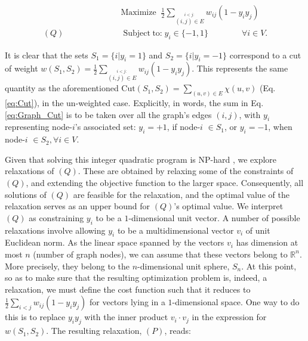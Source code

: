 \vspace{-5mm}
\begin{equation}\label{eq:Graph_Cut}
  \begin{split}
  &\mathrm{Maximize}\;\;\frac{1}{2}\sum_{\stackrel{i < j:}{(i,j)\in E}}w_{i j}(1-y_{i}y_{j}) \\
  (Q)\qquad\qquad\qquad&\operatorname{Subject\;to:}y_{i}\in\{-1,1\}\qquad\qquad\forall i\in V.
  \end{split}
\end{equation}

\sloppy
\noindent It is clear that the sets $S_1 = \{i|y_i=1\}$ and $S_2 = \{i|y_i=-1\}$ correspond to a cut of weight $w(S_1, S_2) = \frac{1}{2}\sum_{\stackrel{i < j:}{(i,j)\in E}}w_{ij}\left(1-y_{i}y_{j}\right)$. This  represents the same quantity as the aforementioned $\text{Cut}(S_1, S_2) = \sum_{(u, v) \in E} \chi(u, v)$ (Eq. \ref{eq:Cut}), in the un-weighted case. Explicitly, in words, the sum in Eq. \ref{eq:Graph_Cut} is to be taken over all the graph's edges $(i, j)$, with $y_{i}$ representing node-$i$'s associated set: $y_{i}=+1$, if node-$i$ $\in S_1$, or $y_{i}=-1$, when node-$i$ $\in S_2, \forall i \in V$.

Given that solving this integer quadratic program is NP-hard \cite{GW-Algorithm}, we explore relaxations of $(Q)$. These are obtained by relaxing some of the constraints of $(Q)$, and extending the objective function to the larger space. Consequently, all solutions of $(Q)$ are feasible for the relaxation, and the optimal value of the relaxation serves as an upper bound for $(Q)$'s optimal value. We interpret $(Q)$ as constraining $y_i$ to be a $1$-dimensional unit vector. A number of possible relaxations involve allowing $y_i$ to be a multidimensional vector $v_i$ of unit Euclidean norm. As the linear space spanned by the vectors $v_i$ has dimension at most $n$ (number of graph nodes), we can assume that these vectors belong to $\mathbb{R}^{n}$. More precisely, they belong to the $n$-dimensional unit sphere, $S_n$. At this point, so as to make sure that the resulting optimization problem is, indeed, a relaxation, we must define the cost function such that it reduces to $\frac{1}{2}\sum_{i<j}w_{i j}(1-y_{i}y_{j})$ for vectors lying in a $1$-dimensional space. One way to do this is to replace $y_{i}y_{j}$ with the inner product $v_{i} \cdot v_{j}$ in the expression for $w(S_1, S_2)$. The resulting relaxation, $(P)$, reads:

